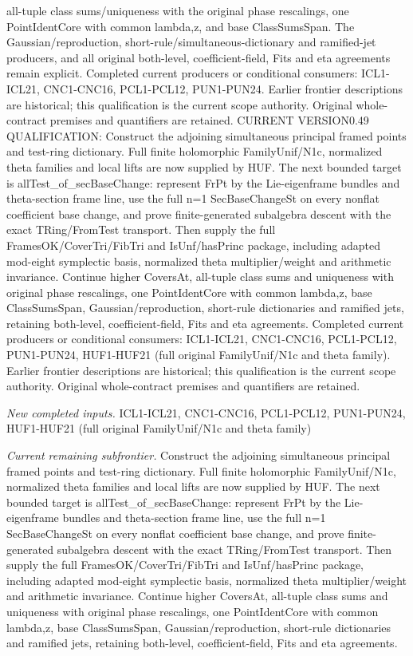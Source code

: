 all-tuple class sums/uniqueness with the original phase rescalings, one PointIdentCore with common lambda,z, and base ClassSumsSpan. The Gaussian/reproduction, short-rule/simultaneous-dictionary and ramified-jet producers, and all original both-level, coefficient-field, Fits and eta agreements remain explicit. Completed current producers or conditional consumers: ICL1-ICL21, CNC1-CNC16, PCL1-PCL12, PUN1-PUN24. Earlier frontier descriptions are historical; this qualification is the current scope authority. Original whole-contract premises and quantifiers are retained. CURRENT VERSION0.49 QUALIFICATION: Construct the adjoining simultaneous principal framed points and test-ring dictionary. Full finite holomorphic FamilyUnif/N1c, normalized theta families and local lifts are now supplied by HUF. The next bounded target is allTest\_\allowbreak of\_\allowbreak secBaseChange: represent FrPt by the Lie-eigenframe bundles and theta-section frame line, use the full n=1 SecBaseChangeSt on every nonflat coefficient base change, and prove finite-generated subalgebra descent with the exact TRing/FromTest transport. Then supply the full FramesOK/CoverTri/FibTri and IsUnf/hasPrinc package, including adapted mod-eight symplectic basis, normalized theta multiplier/weight and arithmetic invariance. Continue higher CoversAt, all-tuple class sums and uniqueness with original phase rescalings, one PointIdentCore with common lambda,z, base ClassSumsSpan, Gaussian/reproduction, short-rule dictionaries and ramified jets, retaining both-level, coefficient-field, Fits and eta agreements. Completed current producers or conditional consumers: ICL1-ICL21, CNC1-CNC16, PCL1-PCL12, PUN1-PUN24, HUF1-HUF21 (full original FamilyUnif/N1c and theta family). Earlier frontier descriptions are historical; this qualification is the current scope authority. Original whole-contract premises and quantifiers are retained.

\emph{New completed inputs.} ICL1-ICL21, CNC1-CNC16, PCL1-PCL12, PUN1-PUN24, HUF1-HUF21 (full original FamilyUnif/N1c and theta family)

\emph{Current remaining subfrontier.} Construct the adjoining simultaneous principal framed points and test-ring dictionary. Full finite holomorphic FamilyUnif/N1c, normalized theta families and local lifts are now supplied by HUF. The next bounded target is allTest\_\allowbreak of\_\allowbreak secBaseChange: represent FrPt by the Lie-eigenframe bundles and theta-section frame line, use the full n=1 SecBaseChangeSt on every nonflat coefficient base change, and prove finite-generated subalgebra descent with the exact TRing/FromTest transport. Then supply the full FramesOK/CoverTri/FibTri and IsUnf/hasPrinc package, including adapted mod-eight symplectic basis, normalized theta multiplier/weight and arithmetic invariance. Continue higher CoversAt, all-tuple class sums and uniqueness with original phase rescalings, one PointIdentCore with common lambda,z, base ClassSumsSpan, Gaussian/reproduction, short-rule dictionaries and ramified jets, retaining both-level, coefficient-field, Fits and eta agreements.




